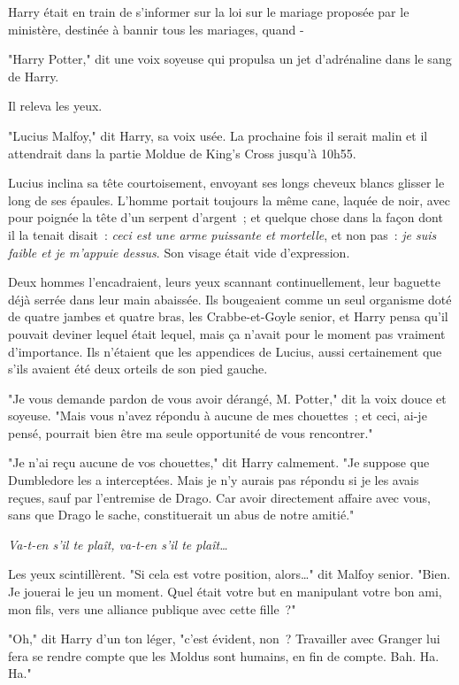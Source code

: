 Harry était en train de s'informer sur la loi sur le mariage proposée par le ministère, destinée à bannir tous les mariages, quand -

"Harry Potter," dit une voix soyeuse qui propulsa un jet d'adrénaline dans le sang de Harry.

Il releva les yeux.

"Lucius Malfoy," dit Harry, sa voix usée. La prochaine fois il serait malin et il attendrait dans la partie Moldue de King's Cross jusqu'à 10h55.

Lucius inclina sa tête courtoisement, envoyant ses longs cheveux blancs glisser le long de ses épaules. L'homme portait toujours la même cane, laquée de noir, avec pour poignée la tête d'un serpent d'argent~; et quelque chose dans la façon dont il la tenait disait~: \emph{ceci est une arme puissante et mortelle}, et non pas~: \emph{je suis faible et je m'appuie dessus}. Son visage était vide d'expression.

Deux hommes l'encadraient, leurs yeux scannant continuellement, leur baguette déjà serrée dans leur main abaissée. Ils bougeaient comme un seul organisme doté de quatre jambes et quatre bras, les Crabbe-et-Goyle senior, et Harry pensa qu'il pouvait deviner lequel était lequel, mais ça n'avait pour le moment pas vraiment d'importance. Ils n'étaient que les appendices de Lucius, aussi certainement que s'ils avaient été deux orteils de son pied gauche.

"Je vous demande pardon de vous avoir dérangé, M. Potter," dit la voix douce et soyeuse. "Mais vous n'avez répondu à aucune de mes chouettes~; et ceci, ai-je pensé, pourrait bien être ma seule opportunité de vous rencontrer."

"Je n'ai reçu aucune de vos chouettes," dit Harry calmement. "Je suppose que Dumbledore les a interceptées. Mais je n'y aurais pas répondu si je les avais reçues, sauf par l'entremise de Drago. Car avoir directement affaire avec vous, sans que Drago le sache, constituerait un abus de notre amitié."

\emph{Va-t-en s'il te plaît, va-t-en s'il te plaît…}

Les yeux scintillèrent. "Si cela est votre position, alors…" dit Malfoy senior. "Bien. Je jouerai le jeu un moment. Quel était votre but en manipulant votre bon ami, mon fils, vers une alliance publique avec cette fille~?"

"Oh," dit Harry d'un ton léger, "c'est évident, non~? Travailler avec Granger lui fera se rendre compte que les Moldus sont humains, en fin de compte. Bah. Ha. Ha."

